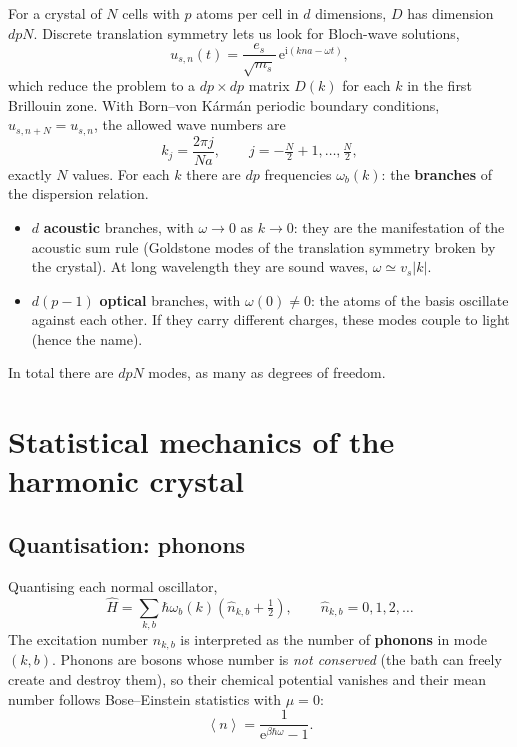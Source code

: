 \documentclass[11pt,a4paper]{article}
\newcommand{\ii}{\mathrm{i}}
\newcommand{\ee}{\mathrm{e}}
\newcommand{\avg}[1]{\left\langle #1\right\rangle}
\newcommand{\vs}{v_{s}}
\begin{document}
For a crystal of $N$ cells with $p$ atoms per cell in $d$ dimensions, $D$ has
dimension $dpN$. Discrete translation symmetry lets us look for Bloch-wave
solutions,
\begin{equation}
u_{s,n}(t)=\frac{e_s}{\sqrt{m_s}}\,\ee^{\ii(kna-\omega t)},
\end{equation}
which reduce the problem to a $dp\times dp$ matrix $D(k)$ for each $k$ in the
first Brillouin zone. With Born–von Kármán periodic boundary conditions,
$u_{s,n+N}=u_{s,n}$, the allowed wave numbers are
\begin{equation}
k_j=\frac{2\pi j}{Na},\qquad j=-\tfrac N2+1,\dots,\tfrac N2,
\end{equation}
exactly $N$ values. For each $k$ there are $dp$ frequencies $\omega_b(k)$:
the \textbf{branches} of the dispersion relation.
\begin{itemize}
\item $d$ \textbf{acoustic} branches, with $\omega\to0$ as $k\to0$: they are the
  manifestation of the acoustic sum rule (Goldstone modes of the translation
  symmetry broken by the crystal). At long wavelength they are sound waves,
  $\omega\simeq \vs|k|$.
\item $d(p-1)$ \textbf{optical} branches, with $\omega(0)\neq0$: the atoms of
  the basis oscillate against each other. If they carry different charges,
  these modes couple to light (hence the name).
\end{itemize}
In total there are $dpN$ modes, as many as degrees of freedom.

\section{Statistical mechanics of the harmonic crystal}

\subsection{Quantisation: phonons}

Quantising each normal oscillator,
\begin{equation}
\hat H=\sum_{k,b}\hbar\omega_b(k)\left(\hat n_{k,b}+\tfrac12\right),
\qquad \hat n_{k,b}=0,1,2,\dots
\end{equation}
The excitation number $n_{k,b}$ is interpreted as the number of
\textbf{phonons} in mode $(k,b)$. Phonons are bosons whose number is
\emph{not conserved} (the bath can freely create and destroy them), so their
chemical potential vanishes and their mean number follows Bose–Einstein
statistics with $\mu=0$:
\begin{equation}
\avg{n}=\frac{1}{\ee^{\beta\hbar\omega}-1}.
\end{equation}
\end{document}
